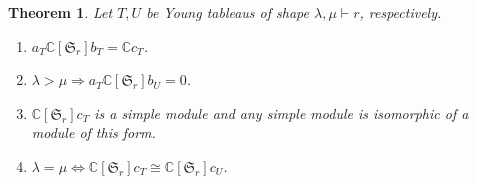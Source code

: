 \documentclass{article}
\newtheorem{theorem}{Theorem} [section]
\numberwithin{equation}{theorem}
\newcommand{\C}[0]{\mathbb{C}}
\newcommand{\fS}[0]{\mathfrak{S}}
\begin{document}
\begin{theorem}
    \label{theorem_young_tableau_fundamental}
    Let $T,U$ be Young tableaus of shape $\lambda,\mu\vdash r$, respectively.
    \begin{enumerate}[1).]
        \item \label{young_tableau:fir}$a_T\C[\fS_r]b_T = \C c_T$.
        \item \label{young_tableau:sec}$\lambda >\mu\Rightarrow a_T\C[\fS_r]b_U = 0$.
        \item \label{young_tableau:thi}$\C[\fS_r]c_T$ is a simple module and any simple module is isomorphic of a module of this form.
        \item \label{young_tableau:fou}$\lambda=\mu\Leftrightarrow\C[\fS_r]c_T\cong\C[\fS_r]c_U$.
    \end{enumerate}
\end{theorem}
\end{document}
